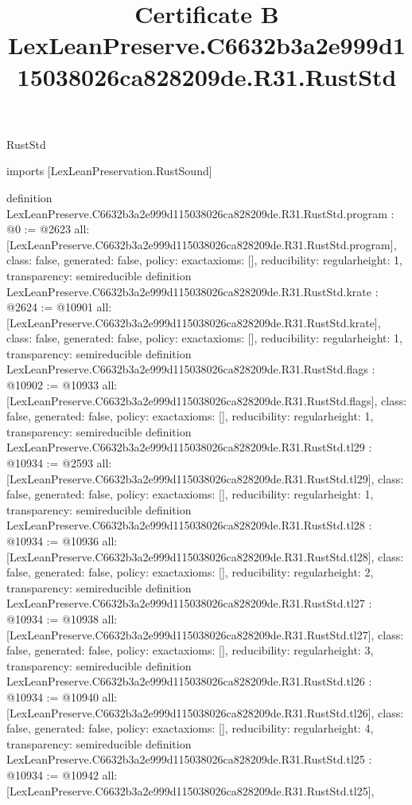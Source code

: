 \begin{lexlean}{RustStd}
\title{Certificate B LexLeanPreserve.C6632b3a2e999d115038026ca828209de.R31.RustStd}
\begin{coremodule}
imports [LexLeanPreservation.RustSound]

definition LexLeanPreserve.C6632b3a2e999d115038026ca828209de.R31.RustStd.program : @0 := @2623 {
  all: [LexLeanPreserve.C6632b3a2e999d115038026ca828209de.R31.RustStd.program],
  class: false,
  generated: false,
  policy: exact{axioms: []},
  reducibility: regular{height: 1},
  transparency: semireducible
}
definition LexLeanPreserve.C6632b3a2e999d115038026ca828209de.R31.RustStd.krate : @2624 := @10901 {
  all: [LexLeanPreserve.C6632b3a2e999d115038026ca828209de.R31.RustStd.krate],
  class: false,
  generated: false,
  policy: exact{axioms: []},
  reducibility: regular{height: 1},
  transparency: semireducible
}
definition LexLeanPreserve.C6632b3a2e999d115038026ca828209de.R31.RustStd.flags : @10902 := @10933 {
  all: [LexLeanPreserve.C6632b3a2e999d115038026ca828209de.R31.RustStd.flags],
  class: false,
  generated: false,
  policy: exact{axioms: []},
  reducibility: regular{height: 1},
  transparency: semireducible
}
definition LexLeanPreserve.C6632b3a2e999d115038026ca828209de.R31.RustStd.tl29 : @10934 := @2593 {
  all: [LexLeanPreserve.C6632b3a2e999d115038026ca828209de.R31.RustStd.tl29],
  class: false,
  generated: false,
  policy: exact{axioms: []},
  reducibility: regular{height: 1},
  transparency: semireducible
}
definition LexLeanPreserve.C6632b3a2e999d115038026ca828209de.R31.RustStd.tl28 : @10934 := @10936 {
  all: [LexLeanPreserve.C6632b3a2e999d115038026ca828209de.R31.RustStd.tl28],
  class: false,
  generated: false,
  policy: exact{axioms: []},
  reducibility: regular{height: 2},
  transparency: semireducible
}
definition LexLeanPreserve.C6632b3a2e999d115038026ca828209de.R31.RustStd.tl27 : @10934 := @10938 {
  all: [LexLeanPreserve.C6632b3a2e999d115038026ca828209de.R31.RustStd.tl27],
  class: false,
  generated: false,
  policy: exact{axioms: []},
  reducibility: regular{height: 3},
  transparency: semireducible
}
definition LexLeanPreserve.C6632b3a2e999d115038026ca828209de.R31.RustStd.tl26 : @10934 := @10940 {
  all: [LexLeanPreserve.C6632b3a2e999d115038026ca828209de.R31.RustStd.tl26],
  class: false,
  generated: false,
  policy: exact{axioms: []},
  reducibility: regular{height: 4},
  transparency: semireducible
}
definition LexLeanPreserve.C6632b3a2e999d115038026ca828209de.R31.RustStd.tl25 : @10934 := @10942 {
  all: [LexLeanPreserve.C6632b3a2e999d115038026ca828209de.R31.RustStd.tl25],
}
\end{coremodule}
\end{lexlean}
